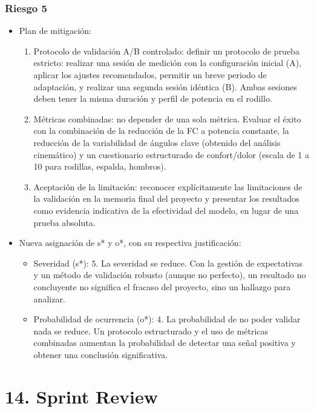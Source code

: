 \documentclass[
11pt, %
]{charter}
\begin{document}
\subsubsection*{Riesgo 5}
\begin{itemize}
    \item Plan de mitigación:
    \begin{enumerate}
        \item Protocolo de validación A/B controlado: definir un protocolo de prueba estricto: realizar una sesión de medición con la configuración inicial (A), aplicar los ajustes recomendados, permitir un breve periodo de adaptación, y realizar una segunda sesión idéntica (B). Ambas sesiones deben tener la misma duración y perfil de potencia en el rodillo.
        \item Métricas combinadas: no depender de una sola métrica. Evaluar el éxito con la combinación de la reducción de la FC a potencia constante, la reducción de la variabilidad de ángulos clave (obtenido del análisis cinemático) y un cuestionario estructurado de confort/dolor (escala de 1 a 10 para rodillas, espalda, hombros).
        \item Aceptación de la limitación: reconocer explícitamente las limitaciones de la validación en la memoria final del proyecto y presentar los resultados como evidencia indicativa de la efectividad del modelo, en lugar de una prueba absoluta.
    \end{enumerate}
    \item Nueva asignación de s* y o*, con su respectiva justificación:
    \begin{itemize}
        \item Severidad (s*): 5. La severidad se reduce. Con la gestión de expectativas y un método de validación robusto (aunque no perfecto), un resultado no concluyente no significa el fracaso del proyecto, sino un hallazgo para analizar.
        \item Probabilidad de ocurrencia (o*): 4. La probabilidad de no poder validar nada se reduce. Un protocolo estructurado y el uso de métricas combinadas aumentan la probabilidad de detectar una señal positiva y obtener una conclusión significativa.
    \end{itemize}
\end{itemize}

\section{14. Sprint Review}
\label{sec:sprint_review}
\end{document}
